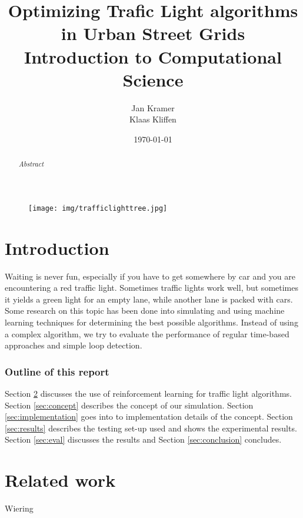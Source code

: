 \documentclass[a4paper,11pt]{article}
\title{Optimizing Trafic Light algorithms in Urban Street Grids\\
\large Introduction to Computational Science}
\author{Jan Kramer\\Klaas Kliffen}
\date{\today}
\begin{document}
\begin{titlepage}
\maketitle
\thispagestyle{empty}
\begin{abstract}
\textit{
 Abstract
}
\end{abstract}
\medskip\medskip
\begin{figure}[H]
  \centering
  \texttt{[image: img/trafficlighttree.jpg]}
\end{figure}


\end{titlepage}

\newpage
\tableofcontents

\newpage

\section{Introduction}
Waiting is never fun, especially if you have to get somewhere by car and you are encountering a red traffic light.
Sometimes traffic lights work well, but sometimes it yields a green light for an empty lane, while another lane is packed with cars.
Some research on this topic has been done into simulating and using machine learning techniques for determining the best
possible algorithms.
Instead of using a complex algorithm, we try to evaluate the performance of regular time-based approaches and simple loop detection.

\subsubsection*{Outline of this report}
Section \ref{sec:rel} discusses the use of reinforcement learning for traffic light algorithms.
Section \ref{sec:concept} describes the concept of our simulation.
Section \ref{sec:implementation} goes into to implementation details of the concept.
Section \ref{sec:results} describes the testing set-up used and shows the experimental results.
Section \ref{sec:eval} discusses the results and Section \ref{sec:conclusion} concludes.

\section{Related work}\label{sec:rel}

Wiering \cite{Wiering00} 
\end{document}
